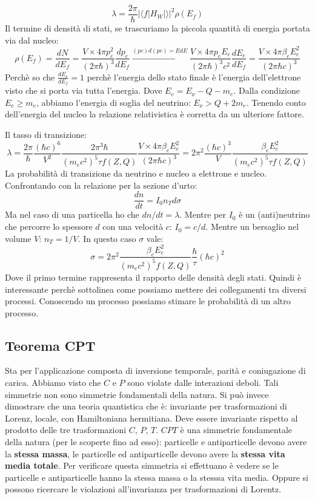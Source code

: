 \begin{equation*}
    \lambda=\frac{2\pi}{\hbar}|\langle f|H_W|\rangle|^2\rho(E_f)
\end{equation*}
Il termine di densità di stati, se trascuriamo la piccola quantità di energia portata via dal nucleo:
\begin{equation*}
    \rho(E_f)=\frac{dN}{dE_f}=\frac{V\times4\pi p_e^2}{(2\pi\hbar)^3}\frac{dp_e}{dE_f}\xrightarrow[]{(pc)d(pc)=EdE}\frac{V\times4\pi p_e E_e}{(2\pi\hbar)^3c^2}\frac{dE_e}{dE_f}=\frac{V\times4\pi\beta_eE^2_e}{(2\pi\hbar c)^3}
\end{equation*}
Perchè so che $\frac{dE_e}{dE_f}=1$ perchè l'energia dello stato finale è l'energia dell'elettrone visto che si porta via tutta l'energia. Dove $E_e=E_\nu-Q-m_e$. Dalla condizione $E_e\ge m_e$, abbiamo l'energia di soglia del neutrino: $E_\nu>Q+2m_e$. Tenendo conto dell'energia del nucleo la relazione relativistica è corretta da un ulteriore fattore.

Il tasso di transizione:
\begin{equation*}
    \lambda=\frac{2\pi}{\hbar}\frac{(\hbar c)^6}{V^2}\frac{2\pi^3\hbar}{(m_ec^2)^5\tau f(Z,Q)}\frac{V\times 4\pi\beta_eE_e^2}{(2\pi\hbar c)^3}=2\pi^2\frac{(\hbar c)^3}{V}\frac{\beta_e E_e^2}{(m_ec^2)^5\tau f(Z,Q)}
\end{equation*}
La probabilità di transizione da neutrino e nucleo a elettrone e nucleo. Confrontando con la relazione per la sezione d'urto:
\begin{equation*}
    \frac{dn}{dt}=I_0n_Td\sigma
\end{equation*}
Ma nel caso di una particella ho che $dn/dt=\lambda$. Mentre per $I_0$ è un (anti)neutrino che percorre lo spessore $d$ con una velocità $c$: $I_0=c/d$. Mentre un bersaglio nel volume $V$: $n_T=1/V$. In questo caso $\sigma$ vale:
\begin{equation*}
    \sigma=2\pi^2\frac{\beta_eE^2_e}{(m_ec^2)^5f(Z,Q)}\frac{\hbar}{\tau}(\hbar c)^2
\end{equation*}
Dove il primo termine rappresenta il rapporto delle densità degli stati. Quindi è interessante perchè sottolinea come possiamo mettere dei collegamenti tra diversi processi. Conoscendo un processo possiamo stimare le probabilità di un altro processo. 
\subsection{Teorema CPT}
Sta per l'applicazione composta di inversione temporale, parità e coniugazione di carica. Abbiamo visto che $C$ e $P$ sono violate dalle interazioni deboli. Tali simmetrie non sono simmetrie fondamentali della natura. Si può invece dimostrare che una teoria quantistica che è: invariante per trasformazioni di Lorenz, locale, con Hamiltoniana hermitiana. Deve essere invariante rispetto al prodotto delle tre trasformazioni $C$, $P$, $T$. $CPT$ è una simmetrie fondamentale della natura (per le scoperte fino ad esso):
particelle e antiparticelle devono avere la \textbf{stessa massa}, le particelle ed antiparticelle devono avere la \textbf{stessa vita media totale}. Per verificare questa simmetria si effettuano è vedere se le particelle e antiparticelle hanno la stessa massa o la stesssa vita media. Oppure si possono ricercare le violazioni all'invarianza per trasformazioni di Lorentz.